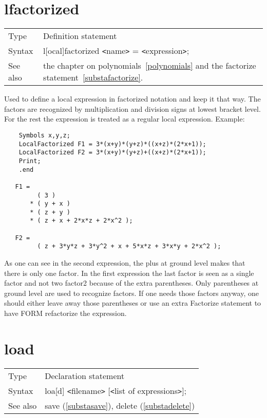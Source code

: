 \section{lfactorized}
\label{substalfactorized}

\noindent \begin{tabular}{ll}
Type & Definition statement\\
Syntax & l[ocal]factorized {\tt<}name{\tt>} = {\tt<}expression{\tt>};
\\ See also & the chapter on polynomials~\ref{polynomials} and the 
factorize statement~\ref{substafactorize}.
\end{tabular} \vspace{4mm}

\noindent Used to define a local expression in factorized 
notation and keep it that way. The factors are recognized by multiplication 
and division signs at lowest bracket level. For the rest the expression is 
treated as a regular local expression. Example:
\begin{verbatim}
    Symbols x,y,z;
    LocalFactorized F1 = 3*(x+y)*(y+z)*((x+z)*(2*x+1));
    LocalFactorized F2 = 3*(x+y)*(y+z)+((x+z)*(2*x+1));
    Print;
    .end

   F1 =
         ( 3 )
       * ( y + x )
       * ( z + y )
       * ( z + x + 2*x*z + 2*x^2 );

   F2 =
         ( z + 3*y*z + 3*y^2 + x + 5*x*z + 3*x*y + 2*x^2 );
\end{verbatim}
\noindent As one can see in the second expression, the plus at ground level 
makes that there is only one factor. In the first expression the last 
factor is seen as a single factor and not two factor2 because of the extra 
parentheses. Only parentheses at ground level are used to recognize 
factors. If one needs those factors anyway, one should either leave away 
those parentheses or use an extra Factorize statement to have FORM 
refactorize the expression.
\vspace{10mm}


\section{load}
\label{substaload}

\noindent \begin{tabular}{ll}
Type & Declaration statement\\
Syntax & loa[d] {\tt<}filename{\tt>} [{\tt<}list of expressions{\tt>}];
\\ See also & save (\ref{substasave}), delete (\ref{substadelete})
\end{tabular} \vspace{4mm}

